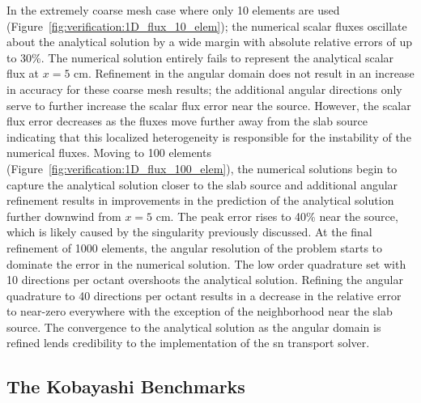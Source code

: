 In the extremely coarse mesh case where only 10 elements are used (Figure~\ref{fig:verification:1D_flux_10_elem}); the numerical scalar fluxes oscillate about the analytical solution by a wide margin with absolute relative errors of up to 30\%. The numerical solution entirely fails to represent the analytical scalar flux at $x = 5$ cm. Refinement in the angular domain does not result in an increase in accuracy for these coarse mesh results; the additional angular directions only serve to further increase the scalar flux error near the source. However, the scalar flux error decreases as the fluxes move further away from the slab source indicating that this localized heterogeneity is responsible for the instability of the numerical fluxes. Moving to 100 elements (Figure~\ref{fig:verification:1D_flux_100_elem}), the numerical solutions begin to capture the analytical solution closer to the slab source and additional angular refinement results in improvements in the prediction of the analytical solution further downwind from $x = 5$ cm. The peak error rises to 40\% near the source, which is likely caused by the singularity previously discussed. At the final refinement of 1000 elements, the angular resolution of the problem starts to dominate the error in the numerical solution. The low order quadrature set with 10 directions per octant overshoots the analytical solution. Refining the angular quadrature to 40 directions per octant results in a decrease in the relative error to near-zero everywhere with the exception of the neighborhood near the slab source. The convergence to the analytical solution as the angular domain is refined lends credibility to the implementation of the \acrshort{sn} transport solver.

\subsection{The Kobayashi Benchmarks}
\label{verification:radiation_transport_sn:kobayashi}

